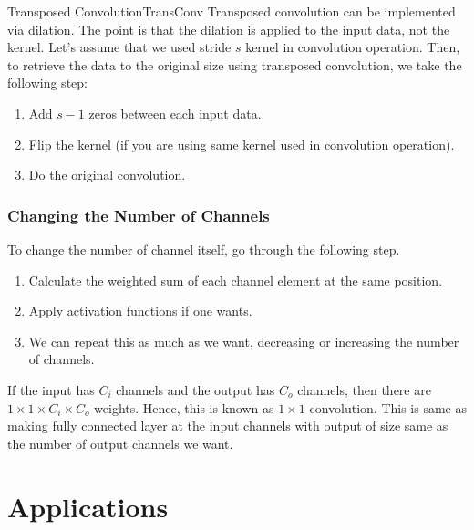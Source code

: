 \documentclass{article}
\begin{document}
            \begin{rem}{Transposed Convolution}{TransConv}
                Transposed convolution can be implemented via dilation. The point is that the dilation is applied to the input data, not the kernel.
                Let's assume that we used stride $s$ kernel in convolution operation. Then, to retrieve the data to the original size using transposed convolution,
                we take the following step:
                \begin{enumerate}
                    \item Add $s-1$ zeros between each input data.
                    \item Flip the kernel (if you are using same kernel used in convolution operation).
                    \item Do the original convolution.
                \end{enumerate}
            \end{rem}
        \subsubsection{Changing the Number of Channels}
            To change the number of channel itself, go through the following step. 
            \begin{enumerate}
                \item Calculate the weighted sum of each channel element at the same position.
                \item Apply activation functions if one wants.
                \item We can repeat this as much as we want, decreasing or increasing the number of channels.
            \end{enumerate}
            If the input has $C_i$ channels and the output has $C_o$ channels, then there are $1 \times 1 \times C_i \times C_o$ weights.
            Hence, this is known as $1\times1$ convolution.
            This is same as making fully connected layer at the input channels with output of size same as the number of output channels we want.

\newpage
\section{Applications}
\end{document}
